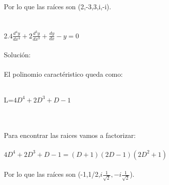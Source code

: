 \documentclass[a4paper,10pt]{article}
\begin{document}
{Por lo que las raíces son (2,-3,3,i,-i).\\\\\\
2.$4\frac{d^4  y}{dx^4}   +2\frac{d^3 y}{dx^3} +\frac{dy}{dx} -y =0$\\\\
Solución:\\\\
El polinomio caractéristico queda como:\\\\
\centerline{L=$4D^4 + 2D^3 +D -1 $}\\\\
Para encontrar las raices vamos a factorizar:\\\\
$4D^4 + 2D^3 +D -1 = (D+1)(2D-1)(2D^2+1)$\\\\
Por lo que las raíces son (-1,1/2,$i\frac{1}{\sqrt{2}} , -i\frac{1}{\sqrt{2}}$).\\\\\\


}
\end{document}
